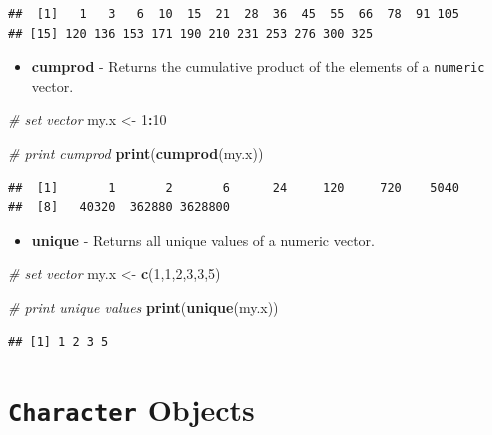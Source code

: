 \documentclass[11pt,]{book}
\newenvironment{Shaded}{\begin{snugshade}}{\end{snugshade}}
\newcommand{\KeywordTok}[1]{\textcolor[rgb]{0.27,0.27,0.27}{\textbf{#1}}}
\newcommand{\DecValTok}[1]{\textcolor[rgb]{0.06,0.06,0.06}{#1}}
\newcommand{\StringTok}[1]{\textcolor[rgb]{0.5,0.5,0.5}{#1}}
\newcommand{\CommentTok}[1]{\textcolor[rgb]{0.56,0.35,0.01}{\textit{#1}}}
\newcommand{\OperatorTok}[1]{\textcolor[rgb]{0.81,0.36,0.00}{\textbf{#1}}}
\newcommand{\NormalTok}[1]{#1}
\providecommand{\tightlist}{%
  \setlength{\itemsep}{0pt}\setlength{\parskip}{0pt}}
\begin{document}
\begin{verbatim}
##  [1]   1   3   6  10  15  21  28  36  45  55  66  78  91 105
## [15] 120 136 153 171 190 210 231 253 276 300 325
\end{verbatim}

\begin{itemize}
\tightlist
\item
  \textbf{cumprod} - Returns the cumulative product of the elements of a
  \texttt{numeric} vector. 
\end{itemize}

\begin{Shaded}
\begin{Highlighting}[]
\CommentTok{# set vector}
\NormalTok{my.x <-}\StringTok{ }\DecValTok{1}\OperatorTok{:}\DecValTok{10}

\CommentTok{# print cumprod}
\KeywordTok{print}\NormalTok{(}\KeywordTok{cumprod}\NormalTok{(my.x))}
\end{Highlighting}
\end{Shaded}

\begin{verbatim}
##  [1]       1       2       6      24     120     720    5040
##  [8]   40320  362880 3628800
\end{verbatim}

\begin{itemize}
\tightlist
\item
  \textbf{unique} - Returns all unique values of a numeric vector.
\end{itemize}

\begin{Shaded}
\begin{Highlighting}[]
\CommentTok{# set vector}
\NormalTok{my.x <-}\StringTok{ }\KeywordTok{c}\NormalTok{(}\DecValTok{1}\NormalTok{,}\DecValTok{1}\NormalTok{,}\DecValTok{2}\NormalTok{,}\DecValTok{3}\NormalTok{,}\DecValTok{3}\NormalTok{,}\DecValTok{5}\NormalTok{)}

\CommentTok{# print unique values}
\KeywordTok{print}\NormalTok{(}\KeywordTok{unique}\NormalTok{(my.x))}
\end{Highlighting}
\end{Shaded}

\begin{verbatim}
## [1] 1 2 3 5
\end{verbatim}

\section{\texorpdfstring{\texttt{Character}
Objects}{Character Objects}}\label{character-objects}
\end{document}
